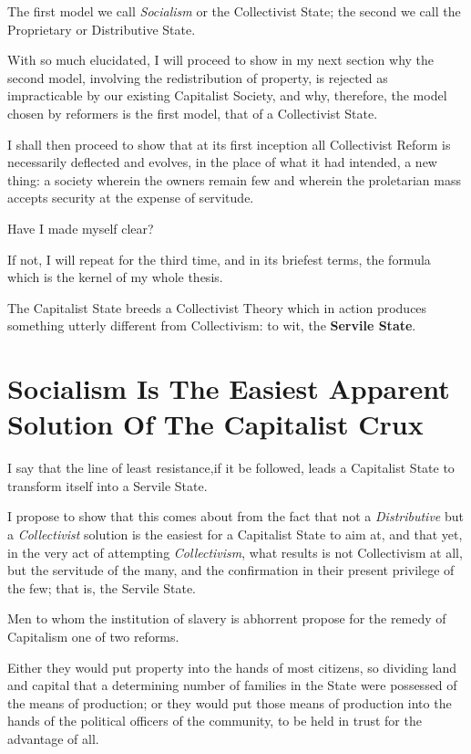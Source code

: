 \documentclass{book}
\begin{document}
The first model we call \emph{Socialism} or the Collectivist State; the second we call the Proprietary or Distributive State.

With so much elucidated, I will proceed to show in my next section why the second model, involving the redistribution of property, is rejected as impracticable by our existing Capitalist Society, and why, therefore, the model chosen by reformers is the first model, that of a Collectivist State.

I shall then proceed to show that at its first inception all Collectivist Reform is necessarily deflected and evolves, in the place of what it had intended, a new thing: a society wherein the owners remain few and wherein the proletarian mass accepts security at the expense of servitude.

Have I made myself clear?

If not, I will repeat for the third time, and in its briefest terms, the formula which is the kernel of my whole thesis.

The Capitalist State breeds a Collectivist Theory which in action produces something utterly different from Collectivism: to wit, the \textbf{Servile State}.

\chapter{Socialism Is The Easiest Apparent Solution Of The Capitalist Crux}
\label{chapter-7}
I say that the line of least resistance,if it be followed, leads a Capitalist State to transform itself into a Servile State.

I propose to show that this comes about from the fact that not a \emph{Distributive} but a \emph{Collectivist} solution is the easiest for a Capitalist State to aim at, and that yet, in the very act of attempting \emph{Collectivism}, what results is not Collectivism at all, but the servitude of the many, and the confirmation in their present privilege of the few; that is, the Servile State.

Men to whom the institution of slavery is abhorrent propose for the remedy of Capitalism one of two reforms.

Either they would put property into the hands of most citizens, so dividing land and capital that a determining number of families in the State were possessed of the means of production; or they would put those means of production into the hands of the political officers of the community, to be held in trust for the advantage of all.
\end{document}
